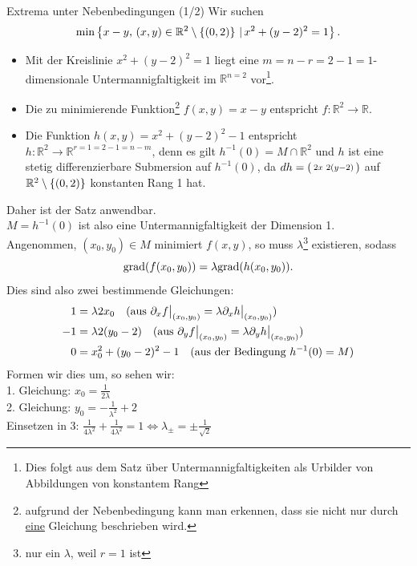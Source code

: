 \begin{Beispiel}
{Extrema unter Nebenbedingungen (1/2)}
Wir suchen
\begin{equation*}
    \min\left\{x-y,\, (x,y)\in\mathbb{R}^2\setminus\left\{(0,2)\right\}\,|\, x^2+(y-2)^2=1\right\}.
\end{equation*}
\begin{itemize}
    \item Mit der Kreislinie $x^2+(y-2)^2=1$ liegt eine $m=n-r=2-1=1$-dimensionale Untermannigfaltigkeit im $\mathbb{R}^{n=2}$ vor\footnote{Dies folgt aus dem Satz über Untermannigfaltigkeiten als Urbilder von Abbildungen von konstantem Rang}.
    \item Die zu minimierende Funktion\footnote{aufgrund der Nebenbedingung kann man erkennen, dass sie nicht nur durch \underline{eine} Gleichung beschrieben wird.} $\boxed{f(x,y)=x-y}$ entspricht $f:\mathbb{R}^2\to\mathbb{R}$.
    \item Die Funktion $h(x,y)=x^2+(y-2)^2-1$ entspricht $h:\mathbb{R}^2\to\mathbb{R}^{r=1=2-1=n-m}$, denn es gilt $h^{-1}(0)=M\cap\mathbb{R}^2$ und $h$ ist eine stetig differenzierbare Submersion auf $h^{-1}(0)$, da $dh=\left(\begin{smallmatrix}2x& 2(y-2)\end{smallmatrix}\right)$ auf $\mathbb{R}^2\setminus\left\{(0,2)\right\}$ konstanten Rang 1 hat.
\end{itemize}
Daher ist der Satz anwendbar.\\
$M=h^{-1}(0)$ ist also eine Untermannigfaltigkeit der Dimension 1.\\
Angenommen, $(x_0, y_0)\in M$ minimiert $f(x,y)$, so muss $\lambda$\footnote{nur ein $\lambda$, weil $r=1$ ist} existieren, sodass
\begin{equation*}
    \text{grad}(f(x_0,y_0))=\lambda\text{grad}(h(x_0,y_0)).
\end{equation*}
Dies sind also zwei bestimmende Gleichungen:
\begin{align*}
    1&=\lambda 2x_0\quad \text{(aus }\partial_xf\big|_{(x_0,y_0)}=\lambda\partial_xh\big|_{(x_0,y_0)})\\
    -1&=\lambda 2(y_0-2)\quad \text{(aus }\partial_yf\big|_{(x_0,y_0)}=\lambda\partial_yh\big|_{(x_0,y_0)})\\
    0&=x_0^2+(y_0-2)^2-1\quad \text{(aus der Bedingung }h^{-1}(0)=M)
\end{align*}
Formen wir dies um, so sehen wir:\\
1. Gleichung: $x_0=\frac{1}{2\lambda}$\\
2. Gleichung: $y_0=-\frac{1}{\lambda^2}+2$\\
Einsetzen in 3: $\frac{1}{4\lambda^2}+\frac{1}{4\lambda^2}=1\iff \lambda_\pm=\pm\frac{1}{\sqrt{2}}$\\

\end{Beispiel}

